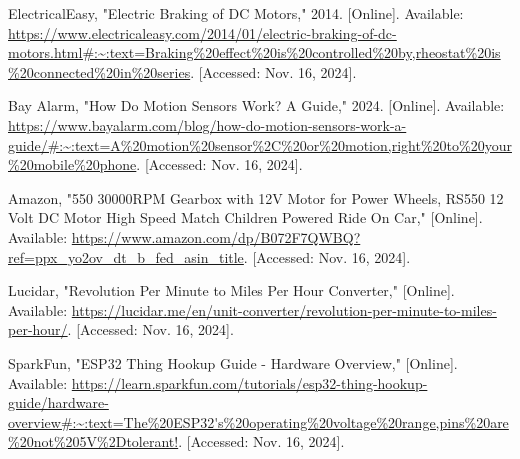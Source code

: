\begin{thebibliography}{45}
	 ElectricalEasy, "Electric Braking of DC Motors," 2014. [Online]. Available: \url{https://www.electricaleasy.com/2014/01/electric-braking-of-dc-motors.html#:~:text=Braking%20effect%20is%20controlled%20by,rheostat%20is%20connected%20in%20series}. [Accessed: Nov. 16, 2024]. 
	
	 Bay Alarm, "How Do Motion Sensors Work? A Guide," 2024. [Online]. Available: \url{https://www.bayalarm.com/blog/how-do-motion-sensors-work-a-guide/#:~:text=A%20motion%20sensor%2C%20or%20motion,right%20to%20your%20mobile%20phone}. [Accessed: Nov. 16, 2024]. 
	
	Amazon, "550 30000RPM Gearbox with 12V Motor for Power Wheels, RS550 12 Volt DC Motor High Speed Match Children Powered Ride On Car," [Online]. Available: \url{https://www.amazon.com/dp/B072F7QWBQ?ref=ppx_yo2ov_dt_b_fed_asin_title}. [Accessed: Nov. 16, 2024].
	
	Lucidar, "Revolution Per Minute to Miles Per Hour Converter," [Online]. Available: \url{https://lucidar.me/en/unit-converter/revolution-per-minute-to-miles-per-hour/}. [Accessed: Nov. 16, 2024].
	
	SparkFun, "ESP32 Thing Hookup Guide - Hardware Overview," [Online]. Available: \url{https://learn.sparkfun.com/tutorials/esp32-thing-hookup-guide/hardware-overview#:~:text=The%20ESP32's%20operating%20voltage%20range,pins%20are%20not%205V%2Dtolerant!}. [Accessed: Nov. 16, 2024].
	
\end{thebibliography}

